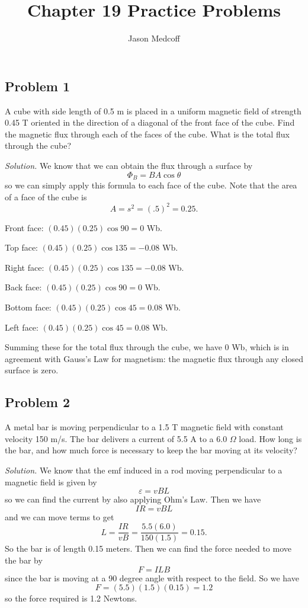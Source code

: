 \documentclass{article}
\title{Chapter 19 Practice Problems}
\author{Jason Medcoff}
\date{}
\begin{document}
	\maketitle
	
	\subsection{Problem 1}
	A cube with side length of 0.5 m is placed in a uniform magnetic field of strength 0.45 T oriented in the direction of a diagonal of the front face of the cube. Find the magnetic flux through each of the faces of the cube. What is the total flux through the cube?
	
	\textit{Solution.}
	We know that we can obtain the flux through a surface by
	$$ \Phi_B = BA\cos\theta $$
	so we can simply apply this formula to each face of the cube. Note that the area of a face of the cube is
	$$ A = s^2 = (.5)^2 = 0.25. $$
	
	Front face: $(0.45)(0.25)\cos90 = 0$ Wb.
	
	Top face: $(0.45)(0.25)\cos135 = -0.08$ Wb.
	
	Right face: $(0.45)(0.25)\cos135 = -0.08$ Wb.
	
	Back face: $(0.45)(0.25)\cos90 = 0$ Wb.
	
	Bottom face: $(0.45)(0.25)\cos45 = 0.08$ Wb.
	
	Left face: $(0.45)(0.25)\cos45 = 0.08$ Wb.
	
	Summing these for the total flux through the cube, we have 0 Wb, which is in agreement with Gauss's Law for magnetism: the magnetic flux through any closed surface is zero.
	
	\subsection{Problem 2}
	A metal bar is moving perpendicular to a 1.5 T magnetic field with constant velocity 150 m/s. The bar delivers a current of 5.5 A to a 6.0 $\Omega$ load. How long is the bar, and how much force is necessary to keep the bar moving at its velocity?
	
	\textit{Solution.}
	We know that the emf induced in a rod moving perpendicular to a magnetic field is given by
	$$ \varepsilon = vBL $$
	so we can find the current by also applying Ohm's Law. Then we have
	$$ IR = vBL $$ and we can move terms to get
	$$ L = \frac{IR}{vB} = \frac{5.5(6.0)}{150(1.5)} = 0.15 . $$
	So the bar is of length 0.15 meters. Then we can find the force needed to move the bar by
	$$ F = ILB $$
	since the bar is moving at a 90 degree angle with respect to the field. So we have
	$$ F = (5.5)(1.5)(0.15) = 1.2 $$
	so the force required is 1.2 Newtons.
	
\end{document}

